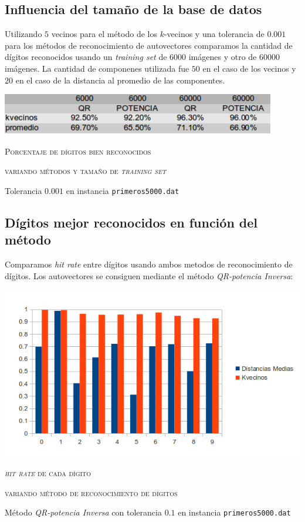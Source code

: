	\subsection{Influencia del tama\~no de la base de datos}

		Utilizando $5$ vecinos para el m\'etodo de los $k$-vecinos y una tolerancia
		de $0.001$ para los m\'etodos de reconocimiento de autovectores comparamos
		la cantidad de d\'igitos reconocidos usando un \textit{training set} de
		$6000$ im\'agenes y otro de $60000$ im\'agenes.
		La cantidad de componenes utilizada fue $50$ en el caso de los vecinos
		y $20$ en el caso de la distancia al promedio de las componentes.

		\vspace{5mm}
		\centerline{\includegraphics[width=12cm]{img/tamBaseDatos.png}}
		\centerline{\textsc{Porcentaje de d\'igitos bien reconocidos}}
		\centerline{\textsc{variando m\'etodos y tama\~no de \textit{training set}}}
		\centerline{Tolerancia $0.001$ en instancia \texttt{primeros5000.dat}}
		\vspace{5mm}


	\subsection{D\'igitos mejor reconocidos en funci\'on del m\'etodo}

		Comparamos \textit{hit rate} entre d\'igitos usando ambos metodos de reconocimiento
		de d\'igitos. Los autovectores se consiguen mediante el m\'etodo
		\textit{QR-potencia Inversa}:

		\vspace{5mm}
		\centerline{\includegraphics[width=14cm]{img/bam.png}}
		\centerline{\textsc{\textit{hit rate} de cada d\'igito}}
		\centerline{\textsc{variando m\'etodo de reconocimiento de d\'igitos}}
		\centerline{M\'etodo \textit{QR-potencia Inversa} con tolerancia $0.1$ en
		instancia \texttt{primeros5000.dat}}
		\vspace{5mm}
